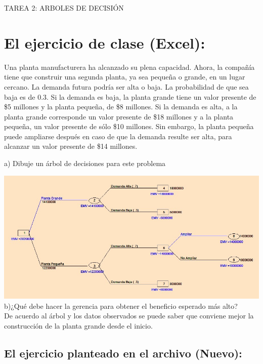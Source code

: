 \documentclass[spanish]{article}
\begin{document}
\pagestyle{fancy}
\fancyhf{}
\begin{center}
\LARGE{TAREA 2: ARBOLES DE DECISIÓN}
\section{El ejercicio de clase (Excel):}
\justify
\normalsize Una planta manufacturera ha alcanzado su plena capacidad. Ahora, la compañía tiene que construir una segunda planta, ya sea pequeña o grande, en un lugar cercano. La demanda futura podría ser alta o baja. La probabilidad de que sea baja es de 0.3. Si la demanda es baja, la planta grande tiene un valor presente de \$5 millones y la planta pequeña, de \$8 millones. Si la demanda es alta, a la planta grande corresponde un valor presente de \$18 millones y a la planta pequeña, un valor presente de sólo \$10 millones. Sin embargo, la planta pequeña puede ampliarse después en caso de que la demanda resulte ser alta, para alcanzar un valor presente de \$14 millones.\newline

\hspace{10mm} a) Dibuje un árbol de decisiones para este problema \newline

\includegraphics[width=1.0\linewidth,height=0.3\textheight]{arbol1.jpg}\\

\hspace{10mm}b)¿Qué debe hacer la gerencia para obtener el beneficio esperado más alto?\\

\justify
\normalsize De acuerdo al árbol y los datos observados se puede saber que conviene mejor la construcción de la planta grande desde el inicio.
\begin{center}
\section{El ejercicio planteado en el archivo (Nuevo):}
\end{center}


\end{center}
\end{document}
